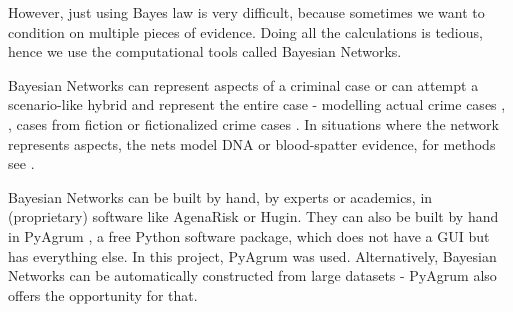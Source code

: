 However, just using Bayes law is very difficult, because sometimes we want to condition on multiple pieces of evidence. Doing all the calculations is tedious, hence we use the computational tools called Bayesian Networks. 

Bayesian Networks can represent aspects of a criminal case or can attempt a scenario-like hybrid and represent the entire case - modelling actual crime cases \citep{Kadane1996}, \citep{Fenton2019},  cases from fiction \citep{Fenton2012} or fictionalized crime cases \citep{vanLeeuwen2019}. In situations where the network represents aspects, the nets model DNA or blood-spatter evidence, for methods see \citep{Meester2021}. 

Bayesian Networks can be built by hand, by experts or academics, in (proprietary) software like AgenaRisk or Hugin. They can also be built by hand in PyAgrum \citep{pyagrum2020}, a free Python software package, which does not have a GUI but has everything else. In this project, PyAgrum was used. Alternatively, Bayesian Networks can be automatically constructed from large datasets - PyAgrum also offers the opportunity for that. %

